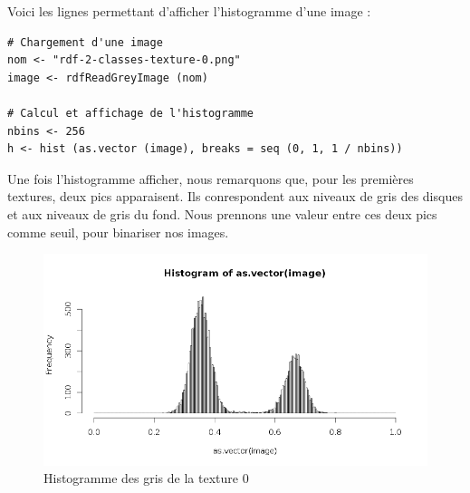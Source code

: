 \documentclass[11pt]{article}
\begin{document}
  Voici les lignes permettant d'afficher l'histogramme d'une image :
  
  \begin{lstlisting}[caption=Afficher l'histogramme d'une image]
# Chargement d'une image
nom <- "rdf-2-classes-texture-0.png"
image <- rdfReadGreyImage (nom)

# Calcul et affichage de l'histogramme
nbins <- 256
h <- hist (as.vector (image), breaks = seq (0, 1, 1 / nbins))\end{lstlisting}

  Une fois l'histogramme afficher, nous remarquons que, pour les premières textures, deux pics apparaisent. 
  Ils conrespondent aux niveaux de gris des disques et aux niveaux de gris du fond. Nous prennons une valeur 
  entre ces deux pics comme seuil, pour binariser nos images.
  
  \begin{figure}[H]
    \center
    \includegraphics[width=14cm]{../elliot/gris0.png}
    \caption{Histogramme des gris de la texture 0}
  \end{figure}
\end{document}
